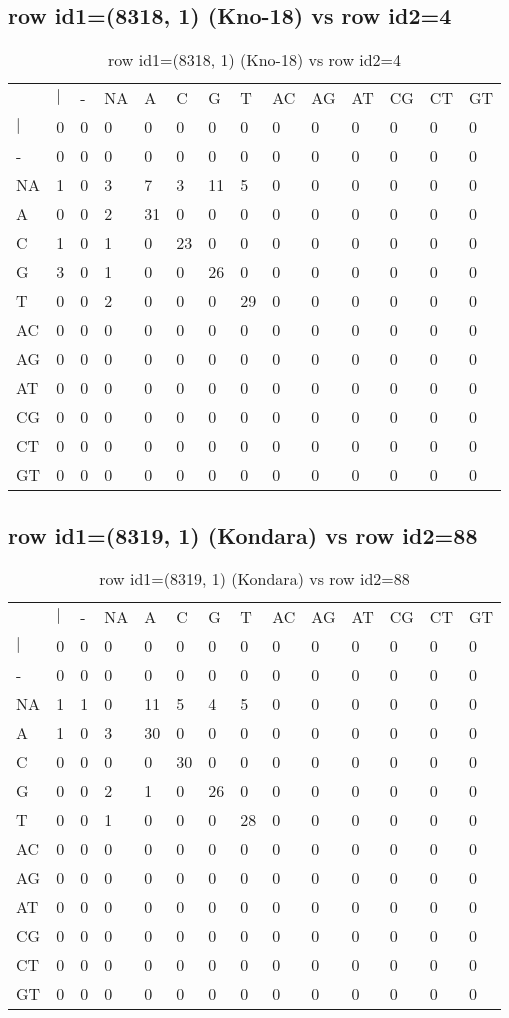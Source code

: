 \subsection{row id1=(8318, 1) (Kno-18) vs row id2=4}
\begin{center}
\begin{longtable}{|l|l|l|l|l|l|l|l|l|l|l|l|l|l|}
\caption{row id1=(8318, 1) (Kno-18) vs row id2=4} \label{table_dm314}\\
\hline
\\
\hline
&$|$&-&NA&A&C&G&T&AC&AG&AT&CG&CT&GT\\
$|$&0&0&0&0&0&0&0&0&0&0&0&0&0\\
-&0&0&0&0&0&0&0&0&0&0&0&0&0\\
NA&1&0&3&7&3&11&5&0&0&0&0&0&0\\
A&0&0&2&31&0&0&0&0&0&0&0&0&0\\
C&1&0&1&0&23&0&0&0&0&0&0&0&0\\
G&3&0&1&0&0&26&0&0&0&0&0&0&0\\
T&0&0&2&0&0&0&29&0&0&0&0&0&0\\
AC&0&0&0&0&0&0&0&0&0&0&0&0&0\\
AG&0&0&0&0&0&0&0&0&0&0&0&0&0\\
AT&0&0&0&0&0&0&0&0&0&0&0&0&0\\
CG&0&0&0&0&0&0&0&0&0&0&0&0&0\\
CT&0&0&0&0&0&0&0&0&0&0&0&0&0\\
GT&0&0&0&0&0&0&0&0&0&0&0&0&0\\
\hline
\end{longtable}
\end{center}

\subsection{row id1=(8319, 1) (Kondara) vs row id2=88}
\begin{center}
\begin{longtable}{|l|l|l|l|l|l|l|l|l|l|l|l|l|l|}
\caption{row id1=(8319, 1) (Kondara) vs row id2=88} \label{table_dm316}\\
\hline
\\
\hline
&$|$&-&NA&A&C&G&T&AC&AG&AT&CG&CT&GT\\
$|$&0&0&0&0&0&0&0&0&0&0&0&0&0\\
-&0&0&0&0&0&0&0&0&0&0&0&0&0\\
NA&1&1&0&11&5&4&5&0&0&0&0&0&0\\
A&1&0&3&30&0&0&0&0&0&0&0&0&0\\
C&0&0&0&0&30&0&0&0&0&0&0&0&0\\
G&0&0&2&1&0&26&0&0&0&0&0&0&0\\
T&0&0&1&0&0&0&28&0&0&0&0&0&0\\
AC&0&0&0&0&0&0&0&0&0&0&0&0&0\\
AG&0&0&0&0&0&0&0&0&0&0&0&0&0\\
AT&0&0&0&0&0&0&0&0&0&0&0&0&0\\
CG&0&0&0&0&0&0&0&0&0&0&0&0&0\\
CT&0&0&0&0&0&0&0&0&0&0&0&0&0\\
GT&0&0&0&0&0&0&0&0&0&0&0&0&0\\
\hline
\end{longtable}
\end{center}

